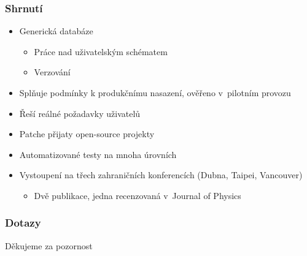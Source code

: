 \documentclass{beamer}
\begin{document}
\begin{frame}[fragile]
\frametitle{Shrnutí}
\begin{itemize}
    \item Generická databáze
        \begin{itemize}
            \item Práce nad uživatelským schématem
            \item Verzování
        \end{itemize}
    \item Splňuje podmínky k produkčnímu nasazení, ověřeno v~pilotním provozu
    \item Řeší reálné požadavky uživatelů
    \item Patche přijaty open-source projekty
    \item Automatizované testy na mnoha úrovních
    \item Vystoupení na třech zahraničních konferencích (Dubna, Taipei, Vancouver)
        \begin{itemize}
            \item Dvě publikace, jedna recenzovaná v~Journal of Physics
        \end{itemize}
\end{itemize}
\end{frame}


\begin{frame}[fragile]
\frametitle{Dotazy}
\begin{center}
    Děkujeme za pozornost
\end{center}
\end{frame}
\end{document}
